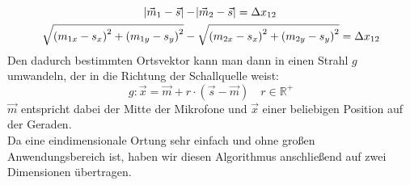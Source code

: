 \begin{gather}
\abs{\vec{m}_1 - \vec{s}} - \abs{\vec{m}_2 - \vec{s}} = \Delta{x_{12}}\\
\sqrt{{(m_{1x} - s_x)}^2 + {(m_{1y} - s_y)}^2} - \sqrt{{(m_{2x} - s_x)}^2 + {(m_{2y} - s_y)}^2} = \Delta{x_{12}}
\end{gather}
Den dadurch bestimmten Ortsvektor kann man dann in einen Strahl $g$ umwandeln, der in die Richtung der Schallquelle weist:
\begin{equation}
g: \vec{x} = \vec{m} + r \cdot (\vec{s} - \vec{m})\quad r \in \mathbb{R}^+
\end{equation}
$\vec{m}$ entspricht dabei der Mitte der Mikrofone und $\vec{x}$ einer beliebigen Position auf der Geraden.\\
Da eine eindimensionale Ortung sehr einfach und ohne großen Anwendungsbereich ist, haben wir diesen Algorithmus anschließend auf zwei Dimensionen übertragen.
